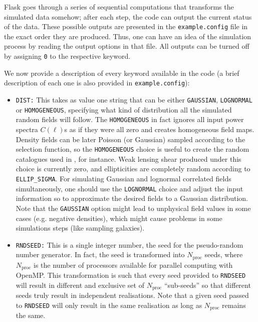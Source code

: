 \documentclass[12pt]{book} %
\newcommand{\nv}[1]{\mathrm{#1}}                 %
\begin{document}
{\sc Flask} goes through a series of sequential computations that transforms the simulated data somehow; 
after each step, the code can output the current status of the data. These possible outputs are 
presented in the {\tt example.config} file in the exact order they are produced. Thus, one can 
have an idea of the simulation process by reading the output options in that file. All outputs 
can be turned off by assigning {\tt 0} to the respective keyword.

We now provide a description of every keyword available in the code (a brief description of 
each one is also provided in {\tt example.config}):

\begin{itemize}

\item {\tt DIST:} This takes as value one string that can be either {\tt GAUSSIAN}, 
  {\tt LOGNORMAL} or {\tt HOMOGENEOUS}, specifying what kind of distribution all 
  the simulated random fields will follow. The {\tt HOMOGENEOUS} in fact ignores 
  all input power spectra $C(\ell)$s as if they were all zero and creates homogeneous 
  field maps. Density fields can be later Poisson (or Gaussian) sampled according to the selection 
  function, so the {\tt HOMOGENEOUS} choice is useful to create the random catalogues 
  used in \citet{LandySzalay93x}, for instance. Weak lensing shear produced under this 
  choice is currently zero, and ellipticities are completely random according to 
  {\tt ELLIP\_SIGMA}. For simulating Gaussian and lognormal correlated fields 
  simultaneously, one should use the {\tt LOGNORMAL} choice and adjust the input 
  information so to approximate the desired fields to a Gaussian distribution. Note that 
  the {\tt GAUSSIAN} option might lead to unphysical field values in some cases (e.g. 
  negative densities), which might cause problems in some simulations steps (like sampling 
  galaxies).

\item {\tt RNDSEED:} This is a single integer number, the seed for the pseudo-random 
  number generator. In fact, the seed is transformed into $N_{\nv{proc}}$ seeds, where 
  $N_{\nv{proc}}$ is the number of processors available for parallel computing with 
  {\sc OpenMP}. This transformation is such that every seed provided to {\tt RNDSEED} 
  will result in different and exclusive set of $N_{\nv{proc}}$ ``sub-seeds'' so that different seeds truly 
  result in independent realisations. Note that a given seed passed to {\tt RNDSEED} will 
  only result in the same realisation as long as $N_{\nv{proc}}$ remains the same.


\end{itemize}
\end{document}
